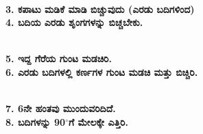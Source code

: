 \begin{figure}[H]
\\
\textbf{3. ಕಪಾಟು ಮಡಿಕೆ ಮಾಡಿ ಬಿಚ್ಚುವುದು (ಎರಡು ಬದಿಗಳಿಂದ)}\\
\textbf{4. ಬದಿಯ ಎರಡು ಶೃಂಗಗಳನ್ನು ಬಿಚ್ಚಬೇಕು.}
\end{figure}
\begin{figure}[H]
\\
\textbf{5. ಇದ್ದ ಗೆರೆಯ ಗುಂಟ ಮಡಚಿರಿ.}\\
\textbf{6. ಎರಡು ಬದಿಗಳಲ್ಲಿ ಕರ್ಣಗಳ ಗುಂಟ ಮಡಚಿ ಮತ್ತು ಬಿಚ್ಚಿರಿ.}
\end{figure}
\begin{figure}[H]
\\
\textbf{7. 6ನೇ ಹಂತವು ಮುಂದುವರಿದಿದೆ.}\\
\textbf{8. ಬದಿಗಳನ್ನು 90$^{\circ}$ಗೆ ಮೇಲಕ್ಕೇ ಎತ್ತಿರಿ.}
\end{figure}

\newpage

